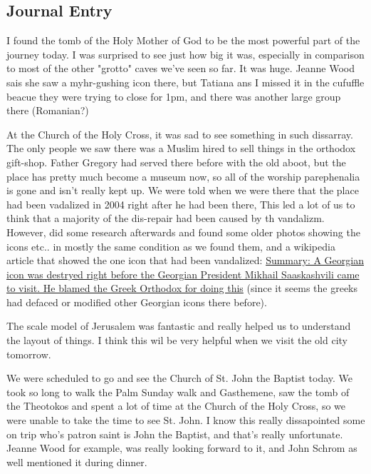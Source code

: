\documentclass[letterpaper]{report}
\begin{document}
\subsection{Journal Entry}
I found the tomb of the Holy Mother of God to be the most powerful part of the journey today.
I was surprised to see just
how big it was, especially in comparison to most of the other "grotto" caves we've
seen so far. It was huge.
Jeanne Wood sais she saw a myhr-gushing icon there, but Tatiana ans I missed it in the cufuffle beacue they were trying to close for 1pm, and there was another large group there (Romanian?)

At the Church of the Holy Cross,
it was sad to see something in such dissarray.
The only people we saw there was a Muslim hired to sell things in the orthodox gift-shop. Father Gregory had served there before with the old aboot,
but the place has pretty much become a museum now,
so all of the worship parephenalia is gone and isn't really kept up.
We were told when we were there that the place had been vadalized in 2004 right after he had been there, This led a lot of us to think that a majority of the dis-repair had been caused by th vandalizm.  However, did some research afterwards and found some older photos showing the icons etc.. in mostly the same condition as we found them,
and a wikipedia article that showed the one icon that had been vandalized:
\href{https://en.m.wikipedia.org/wiki/Monastery_of_the_Cross}{
Summary: A Georgian icon was destryed right before the Georgian President Mikhail Saaskashvili came to visit.
He blamed the Greek Orthodox for doing this}
(since it seems the greeks had defaced or modified other Georgian icons there before).


The scale model of Jerusalem was fantastic
and really helped us to understand the layout of things.
I think this wil be very helpful when we visit the old city tomorrow.

We were scheduled to go and see the
Church of St. John the Baptist today.
We took so long to walk the Palm Sunday walk and Gasthemene, saw the tomb of the Theotokos and spent a lot of time at the Church of the Holy Cross, so
we were unable to take the time to see St. John.
I know this really dissapointed some on trip who's patron saint is John the Baptist, and that's really unfortunate.
Jeanne Wood for example, was really looking forward to it, and John Schrom as well mentioned it during dinner. 

\clearpage
\end{document}
